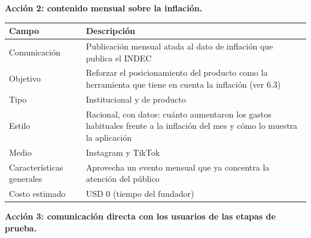 \textbf{Acción 2: contenido mensual sobre la inflación.}

{\def\LTcaptype{none} %
\begin{longtable}[]{@{}
  >{\raggedright\arraybackslash}p{}
  >{\raggedright\arraybackslash}p{}@{}}
\toprule\noalign{}
\begin{minipage}[b]{\linewidth}\raggedright
Campo
\end{minipage} & \begin{minipage}[b]{\linewidth}\raggedright
Descripción
\end{minipage} \\
\midrule\noalign{}
\endhead
\bottomrule\noalign{}
\endlastfoot
Comunicación & Publicación mensual atada al dato de inflación que
publica el INDEC \\
Objetivo & Reforzar el posicionamiento del producto como la herramienta
que tiene en cuenta la inflación (ver 6.3) \\
Tipo & Institucional y de producto \\
Estilo & Racional, con datos: cuánto aumentaron los gastos habituales
frente a la inflación del mes y cómo lo muestra la aplicación \\
Medio & Instagram y TikTok \\
Características generales & Aprovecha un evento mensual que ya concentra
la atención del público \\
Costo estimado & USD 0 (tiempo del fundador) \\
\end{longtable}
}

\textbf{Acción 3: comunicación directa con los usuarios de las etapas de
prueba.}

